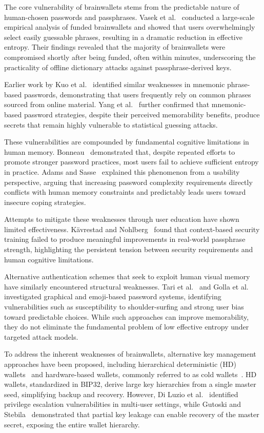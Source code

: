 \documentclass[mathematics,article,accept,pdftex,moreauthors]{Definitions/mdpi}
\begin{document}
The core vulnerability of brainwallets stems from the predictable nature of human-chosen passwords and passphrases. Vasek et al.~\cite{Vasek2017} conducted a large-scale empirical analysis of funded brainwallets and showed that users overwhelmingly select easily guessable phrases, resulting in a dramatic reduction in effective entropy. Their findings revealed that the majority of brainwallets were compromised shortly after being funded, often within minutes, underscoring the practicality of offline dictionary attacks against passphrase-derived keys.

Earlier work by Kuo et al.~\cite{Kuo2006} identified similar weaknesses in mnemonic phrase-based passwords, demonstrating that users frequently rely on common phrases sourced from online material. Yang et al.~\cite{Yang2016} further confirmed that mnemonic-based password strategies, despite their perceived memorability benefits, produce secrets that remain highly vulnerable to statistical guessing attacks.

These vulnerabilities are compounded by fundamental cognitive limitations in human memory. Bonneau~\cite{Bonneau2012,6234435} demonstrated that, despite repeated efforts to promote stronger password practices, most users fail to achieve sufficient entropy in practice. Adams and Sasse~\cite{Adams1999, Sasse2001} explained this phenomenon from a usability perspective, arguing that increasing password complexity requirements directly conflicts with human memory constraints and predictably leads users toward insecure coping strategies.

Attempts to mitigate these weaknesses through user education have shown limited effectiveness. Kävrestad and Nohlberg~\cite{Kavrestad2020} found that context-based security training failed to produce meaningful improvements in real-world passphrase strength, highlighting the persistent tension between security requirements and human cognitive limitations.

Alternative authentication schemes that seek to exploit human visual memory have similarly encountered structural weaknesses. Tari et al.~\cite{Tari2006} and Golla et al.~\cite{Golla2017} investigated graphical and emoji-based password systems, identifying vulnerabilities such as susceptibility to shoulder-surfing and strong user bias toward predictable choices. While such approaches can improve memorability, they do not eliminate the fundamental problem of low effective entropy under targeted attack models.

To address the inherent weaknesses of brainwallets, alternative key management approaches have been proposed, including hierarchical deterministic (HD) wallets~\cite{DiLuzio2020, Gutoski2015} and hardware-based wallets, commonly referred to as cold wallets~\cite{Das2019,8726762}. HD wallets, standardized in BIP32, derive large key hierarchies from a single master seed, simplifying backup and recovery. However, Di Luzio et al.~\cite{DiLuzio2020} identified privilege escalation vulnerabilities in multi-user settings, while Gutoski and Stebila~\cite{Gutoski2015} demonstrated that partial key leakage can enable recovery of the master secret, exposing the entire wallet hierarchy.
\end{document}
